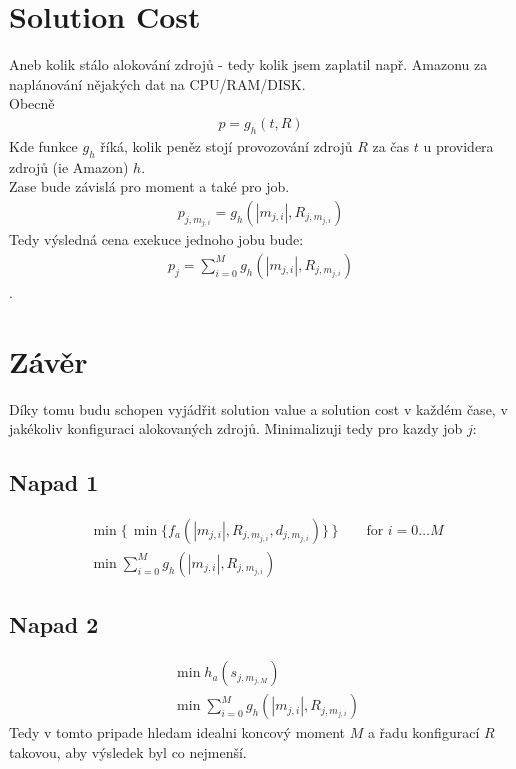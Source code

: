 \documentclass[11pt]{article}
\begin{document}
    \section{Solution Cost}\label{sec:solution-cost}
    Aneb kolik stálo alokování zdrojů - tedy kolik jsem zaplatil např.
    Amazonu za naplánování nějakých dat na CPU/RAM/DISK.\\
    Obecně
    \begin{align*}
        p = g_{h} (t, R)
    \end{align*}
    Kde funkce $g_h$ říká, kolik peněz stojí provozování zdrojů $R$ za čas $t$ u providera zdrojů (ie Amazon) $h$.\\
    Zase bude závislá pro moment a také pro job.
    \begin{align*}
        p_{j, m_{j, i}} = g_{h} (|m_{j,i}|, R_{j, m_{j,i}})
    \end{align*}
    Tedy výsledná cena exekuce jednoho jobu bude:
    \begin{align*}
        p_{j} = \sum_{i = 0}^{M} g_{h} ( |m_{j,i}|, R_{j, m_{j,i}} )
    \end{align*}.

    \section{Závěr}\label{sec:zaver}
    Díky tomu budu schopen vyjádřit solution value a solution cost v každém čase, v jakékoliv konfiguraci alokovaných zdrojů.
    Minimalizuji tedy pro kazdy job $j$:

    \subsection{Napad 1}\label{subsec:napad-11}
    \begin{align*}
        &\min \{\, \min \{ f_{a}(|m_{j, i}|, R_{j, m_{j, i}}, d_{j, m_{j, i}}) \}\, \} \qquad \text{for } i = 0\dots M \\
        &\min \sum_{i = 0}^{M} g_{h} ( |m_{j,i}|, R_{j, m_{j,i}} )
    \end{align*}

    \subsection{Napad 2}\label{subsec:napad-22}
    \begin{align*}
        &\min h_{a}(s_{j, m_{j, M}})\\
        &\min \sum_{i = 0}^{M} g_{h} ( |m_{j,i}|, R_{j, m_{j,i}} )
    \end{align*}
    Tedy v tomto pripade hledam idealni koncový moment $M$ a řadu konfigurací $R$ takovou, aby výsledek
    byl co nejmenší.
\end{document}
